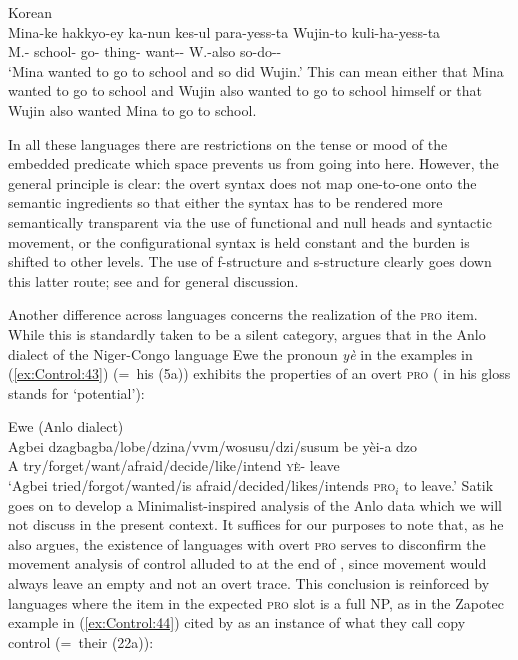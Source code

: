 \documentclass[output=paper,hidelinks]{langscibook}
\begin{document}
\ea\label{ex:Control:42}Korean\\
\gll Mina-ke  hakkyo-ey  ka-nun kes-ul  para-yess-ta Wujin-to kuli-ha-yess-ta\\
{M.-\NOM}  {school-\LOC}  go- {thing-\ACC} {want-\PST-\DECL} W.-also  {so-do-\PST-\DECL}\\
\glt`Mina wanted to go to school and so did Wujin.'
\z
This can mean either that Mina wanted to go to school and Wujin also wanted to go to school himself or that Wujin also wanted Mina to go to school.

In all these languages there are restrictions on the tense or mood of the embedded predicate which space prevents us from going into here. However, the general principle is clear: the overt syntax does not map one-to-one onto the semantic ingredients so that either the syntax has to be rendered more semantically transparent via the use of functional and null heads and syntactic movement, or the configurational syntax is held constant and the burden is shifted to other levels. The use of f-structure and s-structure clearly goes down this latter route; see \citet{Sells07} and \citet{Polinsky2013} for general discussion.

Another difference across languages concerns the realization of the \textsc{pro} item. While this is standardly taken to be a silent category, \citet{Satik2021} argues that in the Anlo dialect of the Niger-Congo language Ewe the pronoun \emph{y{\`e}} in the examples in (\ref{ex:Control:43}) (=~his (5a)) exhibits the properties of an overt \textsc{pro} ( in his gloss stands for `potential'):

\ea\label{ex:Control:43}Ewe (Anlo dialect)\\
\gll Agbei dzagbagba/{\texteng}lobe/dzina/v{\textopeno}v{\textopeno}m/wosusu/dzi/susum be  y{\`e}i-a  dzo\\
A   try/forget/want/afraid/decide/like/intend    {\textsc{y\`e}-} leave\\
\glt   `Agbei tried/forgot/wanted/is afraid/decided/likes/intends \textsc{pro}$_i$ to leave.'
\z
Satik goes on to develop a Minimalist-inspired analysis of the Anlo data which we will not discuss in the present context. It suffices for our purposes to note that, as he also argues, the existence of languages with overt \textsc{pro} serves to disconfirm the movement analysis of control alluded to at the end of , since movement would always leave an empty and not an overt trace. This conclusion is reinforced by languages where the item in the expected \textsc{pro} slot is a full NP, as in the Zapotec example in (\ref{ex:Control:44}) cited by \citet{polipots06} as an instance of what they call copy control (=~their (22a)):
\end{document}
